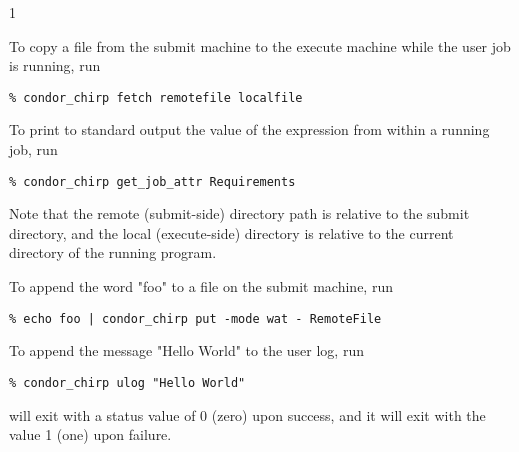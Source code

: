 \begin{ManPage}{\label{man-condor-chirp}}{1}
\Examples

To copy a file from the submit machine to the execute machine while the 
user job is running, run

\footnotesize
\begin{verbatim}
% condor_chirp fetch remotefile localfile
\end{verbatim}
\normalsize

To print to standard output the value of the 
expression from within a running job, run

\footnotesize
\begin{verbatim}
% condor_chirp get_job_attr Requirements
\end{verbatim}
\normalsize

Note that the remote (submit-side) directory path is relative to the
submit directory, and the local (execute-side) directory is relative to the
current directory of the running program.

To append the word "foo" to a file on the submit machine, run

\footnotesize
\begin{verbatim}
% echo foo | condor_chirp put -mode wat - RemoteFile
\end{verbatim}
\normalsize

To append the message "Hello World" to the user log, run

\footnotesize
\begin{verbatim}
% condor_chirp ulog "Hello World"
\end{verbatim}
\normalsize

\ExitStatus

 will exit with a status value of 0 (zero) upon success,
and it will exit with the value 1 (one) upon failure.

\end{ManPage}
